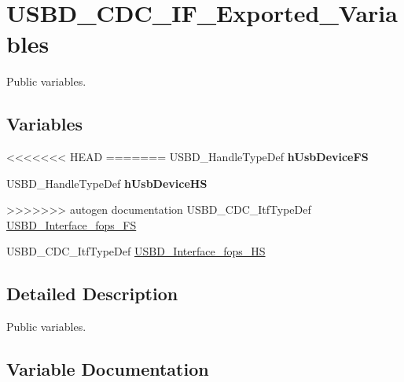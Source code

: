 \hypertarget{group___u_s_b_d___c_d_c___i_f___exported___variables}{}\section{U\+S\+B\+D\+\_\+\+C\+D\+C\+\_\+\+I\+F\+\_\+\+Exported\+\_\+\+Variables}
\label{group___u_s_b_d___c_d_c___i_f___exported___variables}


Public variables.  


\subsection*{Variables}
\begin{DoxyCompactItemize}
\item 
<<<<<<< HEAD
=======
\mbox{\label{group___u_s_b_d___c_d_c___i_f___exported___variables_gafe8a2d9e10b33d5e7906f9f04f95358e}} 
U\+S\+B\+D\+\_\+\+Handle\+Type\+Def {\bfseries h\+Usb\+Device\+FS}
\item 
\mbox{\label{group___u_s_b_d___c_d_c___i_f___exported___variables_ga5abca88253610d01e7e250f30d72cc5b}} 
U\+S\+B\+D\+\_\+\+Handle\+Type\+Def {\bfseries h\+Usb\+Device\+HS}
\item 
>>>>>>> autogen documentation
U\+S\+B\+D\+\_\+\+C\+D\+C\+\_\+\+Itf\+Type\+Def \hyperlink{group___u_s_b_d___c_d_c___i_f___exported___variables_ga99394ed19b774f171df96c2848c411ed}{U\+S\+B\+D\+\_\+\+Interface\+\_\+fops\+\_\+\+FS}
\item 
U\+S\+B\+D\+\_\+\+C\+D\+C\+\_\+\+Itf\+Type\+Def \hyperlink{group___u_s_b_d___c_d_c___i_f___exported___variables_ga54c4abfdfb31c4abdb087abdbbeb65d6}{U\+S\+B\+D\+\_\+\+Interface\+\_\+fops\+\_\+\+HS}
\end{DoxyCompactItemize}


\subsection{Detailed Description}
Public variables. 



\subsection{Variable Documentation}
\mbox{\label{group___u_s_b_d___c_d_c___i_f___exported___variables_ga99394ed19b774f171df96c2848c411ed}} 
